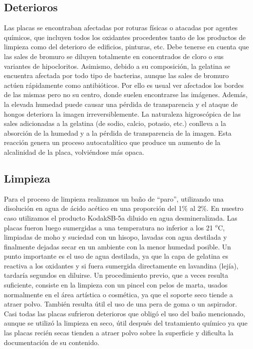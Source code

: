 \documentclass[baaa]{baaa}
\begin{document}
\subsection{Deterioros}
Las placas se encontraban afectadas por roturas físicas o atacadas por agentes químicos, que incluyen todos los oxidantes procedentes tanto de los productos de limpieza como del deterioro de edificios, pinturas, etc.
Debe tenerse en cuenta que las sales de bromuro se diluyen totalmente en concentrados de cloro o sus variantes de hipocloritos.
Asimismo, debido a su composición, la gelatina se encuentra afectada por todo tipo de bacterias, aunque las sales de bromuro actúen rápidamente como antibióticos.
Por ello es usual ver afectados los bordes de las mismas pero no su centro, donde suelen encontrarse las imágenes.
Además, la elevada humedad puede causar una pérdida de transparencia y el ataque de hongos deteriora la imagen irreversiblemente.
La naturaleza higroscópica de las sales adicionadas a la gelatina (de sodio, calcio, potasio, etc.) conlleva a la absorción de la humedad y a la pérdida de transparencia de la imagen.
Esta reacción genera un proceso autocatalítico que produce un aumento de la alcalinidad de la placa, volviéndose más opaca.

\subsection{Limpieza}
Para el proceso de limpieza realizamos un baño de ``paro'', utilizando una disolución en agua de ácido acético en una proporción del 1\% al 2\%.
En nuestro caso utilizamos el producto Kodak\texttrademark SB-5a diluido en agua desmineralizada.
Las placas fueron luego sumergidas a una temperatura no inferior a los 21 $^o$C, limpiadas de moho y suciedad con un hisopo, lavadas con agua destilada y finalmente dejadas secar en un ambiente con la menor humedad posible.
Un punto importante es el uso de agua destilada, ya que la capa de gelatina es reactiva a los oxidantes y si fuera sumergida directamente en lavandina (lejía), tardaría segundos en diluirse.
Un procedimiento previo, que a veces resulta suficiente, consiste en la limpieza con un pincel con pelos de marta, usados normalmente en el área artística o cosmética, ya que el soporte seco tiende a atraer polvo.
También resulta útil el uso de una pera de goma o un aspirador.
Casi todas las placas sufrieron deterioros que obligó el uso del baño mencionado, aunque se utilizó la limpieza en seco, útil después del tratamiento químico ya que las placas recién secas tienden a atraer polvo sobre la superficie y dificulta la documentación de su contenido.
\end{document}
